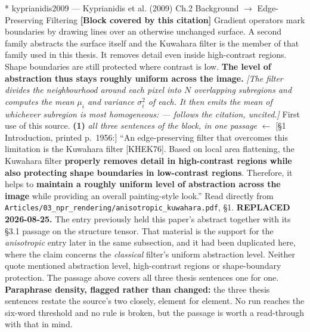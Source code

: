\documentclass[11pt, a4paper]{article}
\makeatletter
\newcounter{citentry}
\newcommand{\citentry@core}[7]{%
  \stepcounter{citentry}
  \begingroup
  \sbox{\citentry@measurebox}{%
    \begin{minipage}{\linewidth}
      \noindent\colorbox{konstanzblue}{\parbox{\dimexpr\linewidth-2\fboxsep}{%
        \vspace{3pt}
        \textbf{\#\thecitentry \quad #2} \hfill \textit{#3}
        \vspace{3pt}
      }}
      \vspace{3pt}
      \noindent\begin{tabular}{@{}p{2.7cm} p{\dimexpr\linewidth-3cm}@{}}
        \textit{\small Sentence in thesis:} & #4 \\[5pt]
        \textbf{Usage:}\hfill       & #5 \\[5pt]
        \textit{\small Original source:}     & #6 \\[5pt]
        \textbf{How to check:}             & #7 \\
      \end{tabular}
      \vspace{5pt}
      \rule{10pt}{10pt}\quad \textbf{Validated} --- I have read the original and agree it supports the sentence.
    \end{minipage}%
  }%
  \Needspace{\dimexpr\ht\citentry@measurebox+\dp\citentry@measurebox\relax}%
  \endgroup
  \vspace{10pt}
  \noindent\colorbox{konstanzblue}{\parbox{\dimexpr\linewidth-2\fboxsep}{%
    \vspace{3pt}
    \textcolor{white}{\textbf{\#\thecitentry \quad #2}} \hfill \textcolor{white}{\textit{#3}}
    \vspace{3pt}
  }}
  \vspace{3pt}
  \noindent\begin{tabular}{@{}p{2.7cm} p{\dimexpr\linewidth-3cm}@{}}
    \textit{\small Sentence in thesis:} & \textcolor{darkgreen}{#4} \\[5pt]
    \textbf{Usage:}\hfill       & #5 \\[5pt]
    \textit{\small Original source:}     & \textcolor{darkred}{#6} \\[5pt]
    \textbf{How to check:}             & #7 \\
  \end{tabular}
  \vspace{5pt}
  \noindent\CheckBox[name=verified\thecitentry, width=10pt, height=10pt, bordercolor={0 0 0}, borderwidth=0.75, backgroundcolor={1 1 1}#1]{}\quad \textbf{Validated} --- I have read the original and agree it supports the sentence.
  \vspace{3pt}
  \noindent\textcolor{midgray}{\rule{\linewidth}{0.4pt}}
}
\newcommand{\citentry}{\@ifstar{\citentry@core{, checked}}{\citentry@core{}}}
\makeatother
\begin{document}
\begin{Form}
\citentry*
  {kyprianidis2009 --- Kyprianidis et al. (2009)}
  {Ch.2 Background $\rightarrow$ Edge-Preserving Filtering}
  {\textbf{[Block covered by this citation]} Gradient operators mark boundaries by drawing lines over an otherwise unchanged surface. A second family abstracts the surface itself and the Kuwahara filter is the member of that family used in this thesis. It removes detail even inside high-contrast regions. Shape boundaries are still protected where contrast is low. \textbf{The level of abstraction thus stays roughly uniform across the image.} \emph{[The filter divides the neighbourhood around each pixel into $N$ overlapping subregions and computes the mean $\mu_i$ and variance $\sigma_i^2$ of each. It then emits the mean of whichever subregion is most homogeneous: --- follows the citation, uncited.]}}
  {First use of this source.}
  {\textbf{(1)} \emph{all three sentences of the block, in one passage} $\leftarrow$ [\S1 Introduction, printed p.~1956:] ``An edge-preserving filter that overcomes this limitation is the Kuwahara filter [KHEK76]. Based on local area flattening, the Kuwahara filter \textbf{properly removes detail in high-contrast regions while also protecting shape boundaries in low-contrast regions}. Therefore, it helps to \textbf{maintain a roughly uniform level of abstraction across the image} while providing an overall painting-style look.''}
  {Read directly from \texttt{\footnotesize Articles/03\_npr\_rendering/anisotropic\_kuwahara.pdf}, \S1. \textbf{REPLACED 2026-08-25.} The entry previously held this paper's abstract together with its \S3.1 passage on the structure tensor. That material is the support for the \emph{anisotropic} entry later in the same subsection, and it had been duplicated here, where the claim concerns the \emph{classical} filter's uniform abstraction level. Neither quote mentioned abstraction level, high-contrast regions or shape-boundary protection. The passage above covers all three thesis sentences one for one. \textbf{Paraphrase density, flagged rather than changed:} the three thesis sentences restate the source's two closely, element for element. No run reaches the six-word threshold and no rule is broken, but the passage is worth a read-through with that in mind.}


\end{Form}
\end{document}
